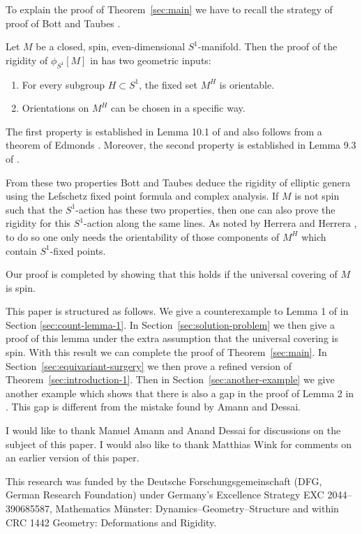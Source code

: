 \documentclass[a4paper, 11pt]{amsart}
\theoremstyle{definition}
\theoremstyle{remark}
\numberwithin{equation}{section}
\begin{document}
To explain the proof of Theorem~\ref{sec:main} we have to recall the strategy of proof of Bott and Taubes \cite{MR954493}.

Let \(M\) be a closed, spin, even-dimensional \(S^1\)-manifold. Then the proof of the rigidity of \(\phi_{S^1}[M]\) in \cite{MR954493} has two geometric inputs:
\begin{enumerate}
\item For every subgroup \(H\subset S^1\), the fixed set \(M^H\) is orientable.
\item Orientations on \(M^H\) can be chosen in a specific way.
\end{enumerate}

The first property is established in Lemma 10.1 of \cite{MR954493} and also follows from a theorem of Edmonds \cite{MR603614}.
Moreover, the second property is established in Lemma 9.3 of \cite{MR954493}.

From these two properties Bott and Taubes deduce the rigidity of elliptic genera using the Lefschetz fixed point formula and complex analysis.
If \(M\) is not spin such that the \(S^1\)-action has these two properties, then one can also prove the rigidity for this \(S^1\)-action along the same lines.
As noted by Herrera and Herrera \cite{MR1979364}, to do so one only needs the orientability of those components of \(M^H\) which contain \(S^1\)-fixed points.

Our proof is completed by showing that this holds if the universal covering of \(M\) is spin.

This paper is structured as follows. We give a counterexample to Lemma 1 of \cite{MR1979364} in Section \ref{sec:count-lemma-1}.
In Section~\ref{sec:solution-problem} we then give a proof of this lemma under the extra assumption that the universal covering is spin. With this result we can complete the proof of Theorem~\ref{sec:main}.
In Section~\ref{sec:equivariant-surgery} we then prove a refined version of Theorem~\ref{sec:introduction-1}.
Then in Section~\ref{sec:another-example} we give another example which shows that there is also a gap in the proof of Lemma 2 in \cite{MR1979364}.
This gap is different from the mistake found by Amann and Dessai.

I would like to thank Manuel Amann and Anand Dessai for discussions on the subject of this paper.
I would also like to thank Matthias Wink for comments on an earlier version of this paper.

This research was funded by the Deutsche Forschungsgemeinschaft (DFG, German Research Foundation) under Germany's Excellence Strategy EXC 2044--390685587, Mathematics M\"unster: Dynamics--Geometry--Structure and within CRC 1442 Geometry: Deformations and Rigidity.
\end{document}

